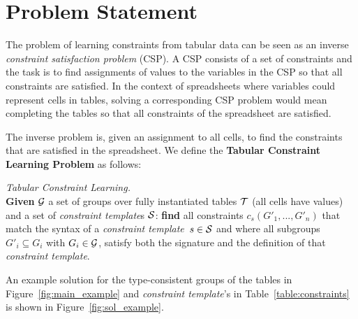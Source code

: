 \documentclass{sig-alternate-05-2015}
\newcommand{\sergey}[1]{\textcolor{magenta}{{\sc Sergey:} #1}\xspace}
\newcommand{\constraints}{\ensuremath{\mathcal{T}}\xspace}
\newcommand{\format}[1]{\textit{#1}\xspace}
\newcommand{\template}{\format{constraint template}}
\newcommand{\CSignature}{Signature\xspace}
\newcommand{\CFunction}{Definition\xspace}
\newcommand{\groups}{\ensuremath{\mathcal{G}}\xspace}
\begin{document}
\section{Problem Statement}\label{sec:problem_statement}
The problem of learning constraints from tabular data can be seen as an inverse {\em constraint satisfaction problem} (CSP). A CSP consists of a set of constraints and the
task is to find assignments of values to the variables in the CSP so that all constraints are satisfied.
In the context of spreadsheets where variables could represent cells in tables, solving a corresponding CSP problem would mean completing the tables so that all constraints of the spreadsheet are satisfied.

The inverse problem is, given an assignment to all cells, to find the constraints that are satisfied in the spreadsheet.
We define the {\bf Tabular Constraint Learning Problem} as follows:
%
\begin{definition} \textit{Tabular Constraint Learning.}\label{def:problem_statement}\\
{\bf   Given} ${\cal G}$ a set of groups over fully instantiated tables ${\cal T}$ (all cells have values) and a set of {\template}s ${\cal S}$: {\bf find } all constraints $c_s(G'_1, ..., G'_n)$ that match the syntax of a \template~$s \in {\cal S}$ and where all subgroups $G'_i \subseteq G_i$ with $G_i \in {\cal G}$, satisfy both the signature and the definition of that \template.
\end{definition}


An example solution for the type-consistent groups of the tables in Figure~\ref{fig:main_example} and {\template}'s in Table~\ref{table:constraints} is shown in Figure~\ref{fig:sol_example}.
\end{document}
